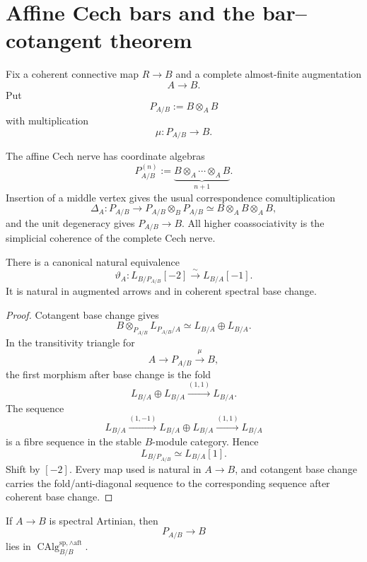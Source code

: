 \section{Affine Cech bars and the bar--cotangent theorem}
\label{sec:as-bar-cotangent}

Fix a coherent connective map $R\to B$ and a complete almost-finite
augmentation
\[
    A\longrightarrow B.
\]
Put
\[
\boxed{
    P_{A/B}:=B\otimes_A B
}
\]
with multiplication
\[
    \mu:P_{A/B}\longrightarrow B.
\]

\begin{construction}
\label{con:as-cech-bar-coalgebra}
The affine Cech nerve has coordinate algebras
\[
    P_{A/B}^{(n)}
    :=
    \underbrace{
        B\otimes_A\cdots\otimes_A B
    }_{n+1}.
\]
Insertion of a middle vertex gives the usual correspondence comultiplication
\[
    \Delta_A:
    P_{A/B}
    \longrightarrow
    P_{A/B}\otimes_BP_{A/B}
    \simeq
    B\otimes_A B\otimes_A B,
\]
and the unit degeneracy gives $P_{A/B}\to B$.  All higher coassociativity is
the simplicial coherence of the complete Cech nerve.
\end{construction}

\begin{lemma}
\label{lem:as-cech-diagonal-cotangent}
There is a canonical natural equivalence
\[
\boxed{
    \vartheta_A:
    L_{B/P_{A/B}}[-2]
    \xrightarrow{\sim}
    L_{B/A}[-1].
}
\]
It is natural in augmented arrows and in coherent spectral base change.
\end{lemma}

\begin{proof}
Cotangent base change gives
\[
    B\otimes_{P_{A/B}}L_{P_{A/B}/A}
    \simeq
    L_{B/A}\oplus L_{B/A}.
\]
In the transitivity triangle for
\[
    A\longrightarrow P_{A/B}\xrightarrow{\mu}B,
\]
the first morphism after base change is the fold
\[
    L_{B/A}\oplus L_{B/A}
    \xrightarrow{(1,1)}
    L_{B/A}.
\]
The sequence
\[
    L_{B/A}
    \xrightarrow{(1,-1)}
    L_{B/A}\oplus L_{B/A}
    \xrightarrow{(1,1)}
    L_{B/A}
\]
is a fibre sequence in the stable $B$-module category.  Hence
\[
    L_{B/P_{A/B}}
    \simeq
    L_{B/A}[1].
\]
Shift by $[-2]$.  Every map used is natural in $A\to B$, and cotangent base
change carries the fold/anti-diagonal sequence to the corresponding sequence
after coherent base change.
\end{proof}

\begin{lemma}
\label{lem:as-diagonal-complete-aft}
If $A\to B$ is spectral Artinian, then
\[
    P_{A/B}\longrightarrow B
\]
lies in
$\operatorname{CAlg}^{\mathrm{sp},\wedge\mathrm{aft}}_{B/B}$.
\end{lemma}

